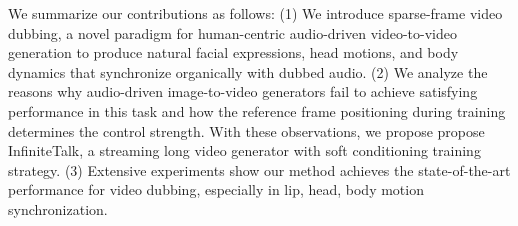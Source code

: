 
We summarize our contributions as follows: (1) We introduce sparse-frame video dubbing, a novel paradigm for human-centric audio-driven video-to-video generation to produce natural facial expressions, head motions, and body dynamics that synchronize organically with dubbed audio. (2) We analyze the reasons why audio-driven image-to-video generators fail to achieve satisfying performance in this task and how the reference frame positioning during training determines the control strength. With these observations, we propose propose InfiniteTalk, a streaming long video generator with soft conditioning training strategy. (3) Extensive experiments show our method achieves the state-of-the-art performance for video dubbing, especially in lip, head, body motion synchronization. 

